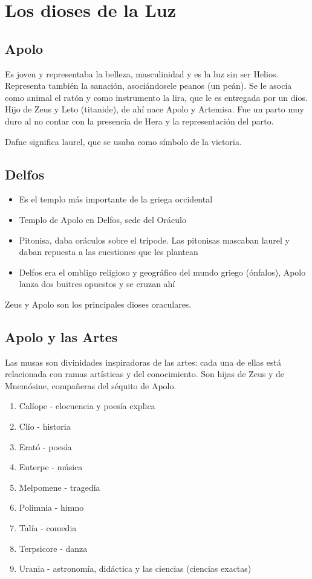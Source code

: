 \section{Los dioses de la Luz}
\subsection{Apolo}
Es joven y representaba la belleza, masculinidad y es la luz sin ser Helios. Representa también la sanación, asociándosele peanos (un peán). Se le asocia como animal el ratón y como instrumento la lira, que le es entregada por un dios.
Hijo de Zeus y Leto (titanide), de ahí nace Apolo y Artemisa. Fue un parto muy duro al no contar con la presencia de Hera y la representación del parto.

Dafne significa laurel, que se usaba como símbolo de la victoria.

\subsection{Delfos}
\begin{itemize}
	\item Es el templo más importante de la griega occidental
	\item Templo de Apolo en Delfos, sede del Oráculo
	\item Pitonisa, daba oráculos sobre el trípode. Las pitonisas mascaban laurel y daban repuesta a las cuestiones que les plantean
	\item Delfos era el ombligo religioso y geográfico del mundo griego (ónfalos), Apolo lanza dos buitres opuestos y se cruzan ahí
\end{itemize}

Zeus y Apolo son los principales dioses oraculares.

\subsection{Apolo y las Artes}
Las musas son divinidades inspiradoras de las artes: cada una de ellas está relacionada con ramas artísticas y del conocimiento. Son hijas de Zeus y de Mnemósine, compañeras del séquito de Apolo.
\begin{enumerate}
	\item Calíope - elocuencia y poesía explica
	\item Clío - historia
	\item Erató - poesía
	\item Euterpe - música
	\item Melpomene - tragedia
	\item Polimnia - himno
	\item Talía - comedia
	\item Terpsicore - danza
	\item Urania - astronomía, didáctica y las ciencias (ciencias exactas)
\end{enumerate}

